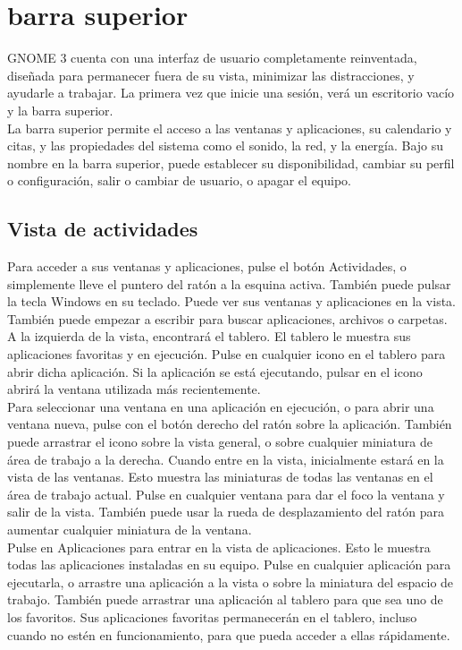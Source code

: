 \chapter{barra superior}
GNOME 3 cuenta con una interfaz de usuario completamente reinventada, diseñada para permanecer fuera de su vista, minimizar las distracciones, y ayudarle a trabajar. La primera vez que inicie una sesión, verá un escritorio vacío y la barra superior.\\

La barra superior permite el acceso a las ventanas y aplicaciones, su calendario y citas, y las propiedades del sistema como el sonido, la red, y la energía. Bajo su nombre en la barra superior, puede establecer su disponibilidad, cambiar su perfil o configuración, salir o cambiar de usuario, o apagar el equipo.
\section{Vista de actividades}
Para acceder a sus ventanas y aplicaciones, pulse el botón Actividades, o simplemente lleve el puntero del ratón a la esquina activa. También puede pulsar la tecla Windows en su teclado. Puede ver sus ventanas y aplicaciones en la vista. También puede empezar a escribir para buscar aplicaciones, archivos o carpetas.\\

A la izquierda de la vista, encontrará el tablero. El tablero le muestra sus aplicaciones favoritas y en ejecución. Pulse en cualquier icono en el tablero para abrir dicha aplicación. Si la aplicación se está ejecutando, pulsar en el icono abrirá la ventana utilizada ​​más recientemente.\\
Para seleccionar una ventana en una aplicación en ejecución, o para abrir una ventana nueva, pulse con el botón derecho del ratón sobre la aplicación. También puede arrastrar el icono sobre la vista general, o sobre cualquier miniatura de área de trabajo a la derecha.
Cuando entre en la vista, inicialmente estará en la vista de las ventanas. Esto muestra las miniaturas de todas las ventanas en el área de trabajo actual. Pulse en cualquier ventana para dar el foco la ventana y salir de la vista. También puede usar la rueda de desplazamiento del ratón para aumentar cualquier miniatura de la ventana.\\
Pulse en Aplicaciones para entrar en la vista de aplicaciones. Esto le muestra todas las aplicaciones instaladas en su equipo. Pulse en cualquier aplicación para ejecutarla, o arrastre una aplicación a la vista o sobre la miniatura del espacio de trabajo. También puede arrastrar una aplicación al tablero para que sea uno de los favoritos. Sus aplicaciones favoritas permanecerán en el tablero, incluso cuando no estén en funcionamiento, para que pueda acceder a ellas rápidamente.
